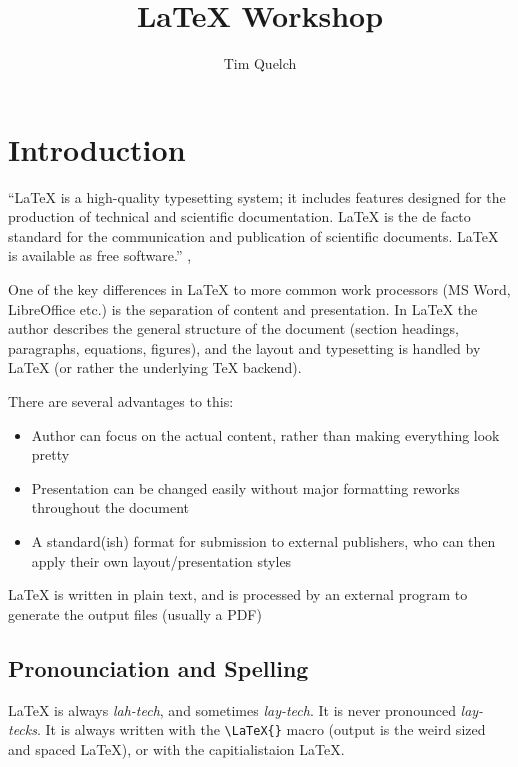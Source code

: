 \documentclass{article}
\title{\LaTeX{} Workshop}
\author{Tim Quelch}
\begin{document}
\maketitle

\tableofcontents

\newpage

\section{Introduction}
``\LaTeX{} is a high-quality typesetting system; it includes features designed for the production of technical and scientific documentation. \LaTeX{} is the de facto standard for the communication and publication of scientific documents. \LaTeX{} is available as free software.''
\cite{latex_project_latex_2018},

One of the key differences in \LaTeX{} to more common work processors (MS Word, LibreOffice etc.) is the separation of content and presentation. In \LaTeX{} the author describes the general structure of the document (section headings, paragraphs, equations, figures), and the layout and typesetting is handled by \LaTeX{} (or rather the underlying \TeX{} backend).

There are several advantages to this:
\begin{itemize}
  \item Author can focus on the actual content, rather than making everything look pretty
  \item Presentation can be changed easily without major formatting reworks throughout the document
  \item A standard(ish) format for submission to external publishers, who can then apply their own layout/presentation styles
\end{itemize}

\LaTeX{} is written in plain text, and is processed by an external program to generate the output files (usually a PDF)

\subsection{Pronounciation and Spelling}
\LaTeX{} is always \emph{lah-tech}, and sometimes \emph{lay-tech}. It is never pronounced \emph{lay-tecks}. It is always written with the \lstinline|\LaTeX{}| macro (output is the weird sized and spaced \LaTeX{}), or with the capitialistaion LaTeX.
\end{document}
